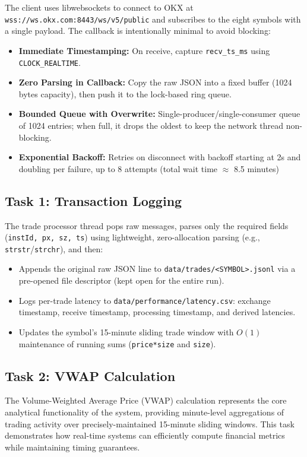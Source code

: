 \documentclass[12pt,a4paper]{article}
\begin{document}
The client uses libwebsockets to connect to OKX at \texttt{wss://ws.okx.com:8443/ws/v5/public} and subscribes to the eight symbols with a single payload. The callback is intentionally minimal to avoid blocking:

\begin{itemize}
    \item \textbf{Immediate Timestamping:} On receive, capture \texttt{recv\_ts\_ms} using \texttt{CLOCK\_REALTIME}.
    \item \textbf{Zero Parsing in Callback:} Copy the raw JSON into a fixed buffer (1024 bytes capacity), then push it to the lock-based ring queue.
    \item \textbf{Bounded Queue with Overwrite:} Single-producer/single-consumer queue of 1024 entries; when full, it drops the oldest to keep the network thread non-blocking.
    \item \textbf{Exponential Backoff:} Retries on disconnect with backoff starting at 2s and doubling per failure, up to 8 attempts (total wait time $\approx$ 8.5 minutes)
\end{itemize}

\subsection{Task 1: Transaction Logging}
The trade processor thread pops raw messages, parses only the required fields (\texttt{instId, px, sz, ts}) using lightweight, zero-allocation parsing (e.g., \texttt{strstr}/\texttt{strchr}), and then:
\begin{itemize}
    \item Appends the original raw JSON line to \texttt{data/trades/<SYMBOL>.jsonl} via a pre-opened file descriptor (kept open for the entire run).
    \item Logs per-trade latency to \texttt{data/performance/latency.csv}: exchange timestamp, receive timestamp, processing timestamp, and derived latencies.
    \item Updates the symbol’s 15-minute sliding trade window with $O(1)$ maintenance of running sums (\texttt{price*size} and \texttt{size}).
\end{itemize}

\subsection{Task 2: VWAP Calculation}

The Volume-Weighted Average Price (VWAP) calculation represents the core analytical functionality of the system, providing minute-level aggregations of trading activity over precisely-maintained 15-minute sliding windows. This task demonstrates how real-time systems can efficiently compute financial metrics while maintaining timing guarantees.
\end{document}
